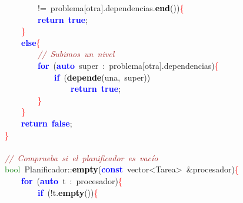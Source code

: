 \mbox{}\ \ \ \ \ \ \ \ \textcolor{BrickRed}{!=}\ problema\textcolor{BrickRed}{[}otra\textcolor{BrickRed}{].}dependencias\textcolor{BrickRed}{.}\textbf{\textcolor{Black}{end}}\textcolor{BrickRed}{())}\textcolor{Red}{\{} \\
\mbox{}\ \ \ \ \ \ \ \ \textbf{\textcolor{Blue}{return}}\ \textbf{\textcolor{Blue}{true}}\textcolor{BrickRed}{;} \\
\mbox{}\ \ \ \ \textcolor{Red}{\}} \\
\mbox{}\ \ \ \ \textbf{\textcolor{Blue}{else}}\textcolor{Red}{\{} \\
\mbox{}\ \ \ \ \ \ \ \ \textit{\textcolor{Brown}{//\ Subimos\ un\ nivel}} \\
\mbox{}\ \ \ \ \ \ \ \ \textbf{\textcolor{Blue}{for}}\ \textcolor{BrickRed}{(}\textbf{\textcolor{Blue}{auto}}\ super\ \textcolor{BrickRed}{:}\ problema\textcolor{BrickRed}{[}otra\textcolor{BrickRed}{].}dependencias\textcolor{BrickRed}{)}\textcolor{Red}{\{} \\
\mbox{}\ \ \ \ \ \ \ \ \ \ \ \ \textbf{\textcolor{Blue}{if}}\ \textcolor{BrickRed}{(}\textbf{\textcolor{Black}{depende}}\textcolor{BrickRed}{(}una\textcolor{BrickRed}{,}\ super\textcolor{BrickRed}{))} \\
\mbox{}\ \ \ \ \ \ \ \ \ \ \ \ \ \ \ \ \textbf{\textcolor{Blue}{return}}\ \textbf{\textcolor{Blue}{true}}\textcolor{BrickRed}{;} \\
\mbox{}\ \ \ \ \ \ \ \ \textcolor{Red}{\}} \\
\mbox{}\ \ \ \ \textcolor{Red}{\}} \\
\mbox{}\ \ \ \ \textbf{\textcolor{Blue}{return}}\ \textbf{\textcolor{Blue}{false}}\textcolor{BrickRed}{;} \\
\mbox{}\textcolor{Red}{\}} \\
\mbox{} \\
\mbox{}\textit{\textcolor{Brown}{//\ Comprueba\ si\ el\ planificador\ es\ vacío}} \\
\mbox{}\textcolor{ForestGreen}{bool}\ Planificador\textcolor{BrickRed}{::}\textbf{\textcolor{Black}{empty}}\textcolor{BrickRed}{(}\textbf{\textcolor{Blue}{const}}\ \textcolor{TealBlue}{vector\textless{}Tarea\textgreater{}}\ \textcolor{BrickRed}{\&}procesador\textcolor{BrickRed}{)}\textcolor{Red}{\{} \\
\mbox{}\ \ \ \ \textbf{\textcolor{Blue}{for}}\ \textcolor{BrickRed}{(}\textbf{\textcolor{Blue}{auto}}\ t\ \textcolor{BrickRed}{:}\ procesador\textcolor{BrickRed}{)}\textcolor{Red}{\{} \\
\mbox{}\ \ \ \ \ \ \ \ \textbf{\textcolor{Blue}{if}}\ \textcolor{BrickRed}{(!}t\textcolor{BrickRed}{.}\textbf{\textcolor{Black}{empty}}\textcolor{BrickRed}{())}\textcolor{Red}{\{} \\
